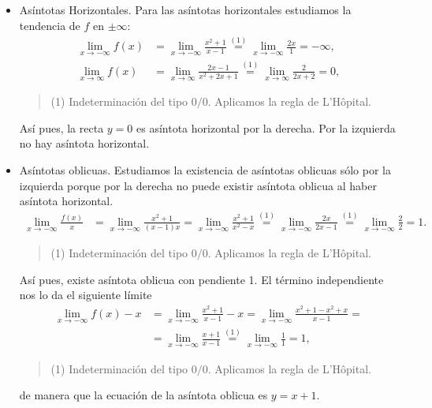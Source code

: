 {\begin{enumerate}
\begin{itemize}
\item Asíntotas Horizontales. Para las asíntotas horizontales estudiamos la tendencia de $f$ en $\pm\infty$:
\begin{align*}
\lim_{x\rightarrow -\infty}f(x)&=\lim_{x\rightarrow -\infty}\frac{x^2+1}{x-1}\stackrel{(1)}{=}\lim_{x\rightarrow -\infty}\frac{2x}{1}=-\infty,\\
\lim_{x\rightarrow \infty}f(x)&=\lim_{x\rightarrow \infty}\frac{2x-1}{x^2+2x+1}\stackrel{(1)}{=}\lim_{x\rightarrow \infty}\frac{2}{2x+2}=0,
\end{align*}
\begin{quote}
\footnotesize
(1) Indeterminación del tipo $0/0$. Aplicamos la regla de L'Hôpital.
\end{quote}    
Así pues, la recta $y=0$ es asíntota horizontal por la derecha. Por la izquierda no hay asíntota horizontal.

\item Asíntotas oblicuas. Estudiamos la existencia de asíntotas oblicuas sólo por la izquierda porque por la derecha no puede existir asíntota oblicua al haber asíntota horizontal.
\begin{align*}
\lim_{x\rightarrow -\infty}\frac{f(x)}{x}&=\lim_{x\rightarrow -\infty}\frac{x^2+1}{(x-1)x}=\lim_{x\rightarrow -\infty}\frac{x^2+1}{x^2-x}\stackrel{(1)}{=}\lim_{x\rightarrow -\infty}\frac{2x}{2x-1}\stackrel{(1)}{=}\lim_{x\rightarrow -\infty}\frac{2}{2}=1.
\end{align*}
\begin{quote}
\footnotesize
(1) Indeterminación del tipo $0/0$. Aplicamos la regla de L'Hôpital.
\end{quote} 
Así pues, existe asíntota oblicua con pendiente 1. El término independiente nos lo da el siguiente límite
\begin{align*}
\lim_{x\rightarrow -\infty}f(x)-x&=\lim_{x\rightarrow -\infty}\frac{x^2+1}{x-1}-x=\lim_{x\rightarrow -\infty}\frac{x^2+1-x^2+x}{x-1}=\\
&=\lim_{x\rightarrow -\infty}\frac{x+1}{x-1}\stackrel{(1)}{=}\lim_{x\rightarrow -\infty}\frac{1}{1}=1,
\end{align*}
\begin{quote}
\footnotesize
(1) Indeterminación del tipo $0/0$. Aplicamos la regla de L'Hôpital.
\end{quote} 
de manera que la ecuación de la asíntota oblicua es $y=x+1$.
\end{itemize}
\end{enumerate}
}


